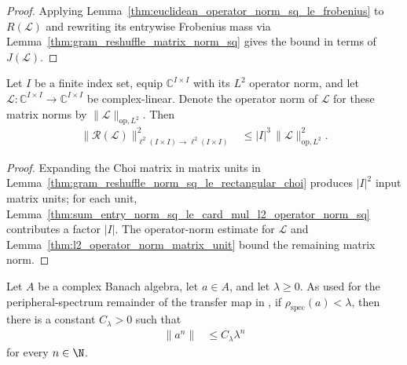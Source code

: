 \begin{proof}
    \leanok
    Applying Lemma~\ref{thm:euclidean_operator_norm_sq_le_frobenius} to
    $R(\mathcal L)$ and rewriting its entrywise Frobenius mass via
    Lemma~\ref{thm:gram_reshuffle_matrix_norm_sq} gives the bound in terms of
    $J(\mathcal L)$.
\end{proof}

\begin{lemma}
    \label{thm:gram_reshuffle_norm_sq_le_card_cube_mul_operator_norm_sq}
    \leanok
    Let $I$ be a finite index set, equip $\mathbb C^{I\times I}$ with its
    $L^2$ operator norm, and let
    $\mathcal L\colon\mathbb C^{I\times I}\to\mathbb C^{I\times I}$ be
    complex-linear.  Denote the operator norm of $\mathcal L$ for these matrix
    norms by $\lVert\mathcal L\rVert_{\mathrm{op},L^2}$.  Then
    \begin{align}
        \bigl\lVert\mathscr R(\mathcal L)\bigr\rVert_{
            \ell^2(I\times I)\to\ell^2(I\times I)}^2
         & \leq |I|^3\,
        \lVert\mathcal L\rVert_{\mathrm{op},L^2}^2.
        \label{eq:gram_reshuffle_norm_sq_le_card_cube_mul_operator_norm_sq}
    \end{align}
\end{lemma}

\begin{proof}
    \leanok
    Expanding the Choi matrix in matrix units in
    Lemma~\ref{thm:gram_reshuffle_norm_sq_le_rectangular_choi} produces
    $|I|^2$ input matrix units; for each unit,
    Lemma~\ref{thm:sum_entry_norm_sq_le_card_mul_l2_operator_norm_sq}
    contributes a factor $|I|$.  The operator-norm estimate for $\mathcal L$
    and Lemma~\ref{thm:l2_operator_norm_matrix_unit} bound the remaining
    matrix norm.
\end{proof}

\begin{lemma}
    \label{thm:geometric_bound_of_spectral_radius_lt}
    \leanok
    Let $A$ be a complex Banach algebra, let $a\in A$, and let
    $\lambda\geq0$.  As used for the peripheral-spectrum remainder of the
    transfer map in \cite[Lemma~5.2]{Fannes1992Finitely}, if
    $\rho_{\mathrm{spec}}(a)<\lambda$, then there is a constant
    $C_\lambda>0$ such that
    \begin{align}
        \lVert a^n\rVert & \leq C_\lambda\lambda^n
        \label{eq:geometric_bound_of_spectral_radius_lt}
    \end{align}
    for every $n\in\N$.
\end{lemma}

